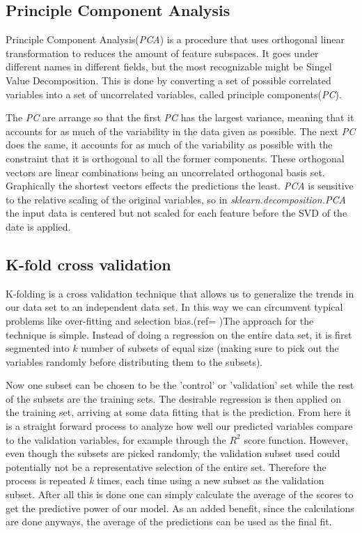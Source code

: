 \subsection{Principle Component Analysis }
	Principle Component Analysis(\textit{PCA}) is a procedure that uses orthogonal linear transformation to reduces the amount of feature subspaces. It goes under different names in different fields, but the most recognizable might be Singel Value Decomposition. This is done by converting a set of possible correlated variables into a set of uncorrelated variables, called principle components(\textit{PC}). 
	
	The \textit{PC} are arrange so that the first \textit{PC} has the largest variance, meaning that it accounts for as much of the variability in the data given as possible. The next \textit{PC} does the same, it accounts for as much of the variability as possible with the constraint that it is orthogonal to all the former components. These orthogonal vectors are linear combinations being an uncorrelated orthogonal basis set. Graphically the shortest vectors effects the predictions the least. \textit{PCA} is sensitive to the relative scaling of the original variables, so in \textit{sklearn.decomposition.PCA} the input data is centered but not scaled for each feature before the SVD of the date is applied. 

\subsection{K-fold cross validation}
	K-folding is a cross validation technique that allows us to generalize the trends in our data set to an independent data set. In this way we can circumvent typical problems like over-fitting and selection bias.(ref=\cite{cross-valid} )The approach for the technique is simple. Instead of doing a regression on the entire data set, it is first segmented into $k$ number of subsets of equal size (making sure to pick out the variables randomly before distributing them to the subsets). 
	
	Now one subset can be chosen to be the 'control' or 'validation' set while the rest of the subsets are the training sets. The desirable regression is then applied on the training set, arriving at some data fitting that is the prediction. From here it is a straight forward process to analyze how well our predicted variables compare to the validation variables, for example through the $R^2$ score function. However, even though the subsets are picked randomly, the validation subset used could potentially not be a representative selection of the entire set. Therefore the process is repeated \textit{k} times, each time using a new subset as the validation subset. After all this is done one can simply calculate the average of the scores to get the predictive power of our model. As an added benefit, since the calculations are done anyways, the average of the predictions can be used as the final fit. 
	
